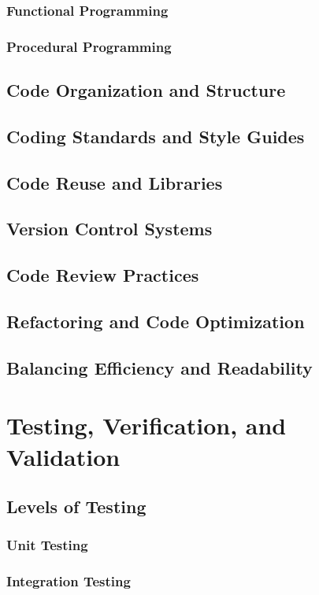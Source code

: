 \subsubsection{Functional Programming}
\subsubsection{Procedural Programming}
\subsection{Code Organization and Structure}
\subsection{Coding Standards and Style Guides}
\subsection{Code Reuse and Libraries}
\subsection{Version Control Systems}
\subsection{Code Review Practices}
\subsection{Refactoring and Code Optimization}
\subsection{Balancing Efficiency and Readability}

\newpage

\section{Testing, Verification, and Validation}
\subsection{Levels of Testing}
\subsubsection{Unit Testing}
\subsubsection{Integration Testing}

